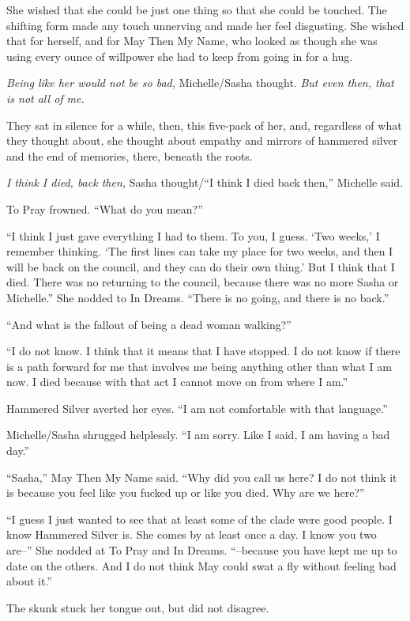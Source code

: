 She wished that she could be just one thing so that she could be touched. The shifting form made any touch unnerving and made her feel disgusting. She wished that for herself, and for May Then My Name, who looked as though she was using every ounce of willpower she had to keep from going in for a hug.

\emph{Being like her would not be so bad,} Michelle/Sasha thought. \emph{But even then, that is not all of me.}

They sat in silence for a while, then, this five-pack of her, and, regardless of what they thought about, she thought about empathy and mirrors of hammered silver and the end of memories, there, beneath the roots.

\emph{I think I died, back then,} Sasha thought/``I think I died back then,'' Michelle said.

To Pray frowned. ``What do you mean?''

``I think I just gave everything I had to them. To you, I guess. `Two weeks,' I remember thinking. `The first lines can take my place for two weeks, and then I will be back on the council, and they can do their own thing.' But I think that I died. There was no returning to the council, because there was no more Sasha or Michelle.'' She nodded to In Dreams. ``There is no going, and there is no back.''

``And what is the fallout of being a dead woman walking?''

``I do not know. I think that it means that I have stopped. I do not know if there is a path forward for me that involves me being anything other than what I am now. I died because with that act I cannot move on from where I am.''

Hammered Silver averted her eyes. ``I am not comfortable with that language.''

Michelle/Sasha shrugged helplessly. ``I am sorry. Like I said, I am having a bad day.''

``Sasha,'' May Then My Name said. ``Why did you call us here? I do not think it is because you feel like you fucked up or like you died. Why are we here?''

``I guess I just wanted to see that at least some of the clade were good people. I know Hammered Silver is. She comes by at least once a day. I know you two are--'' She nodded at To Pray and In Dreams. ``--because you have kept me up to date on the others. And I do not think May could swat a fly without feeling bad about it.''

The skunk stuck her tongue out, but did not disagree.

